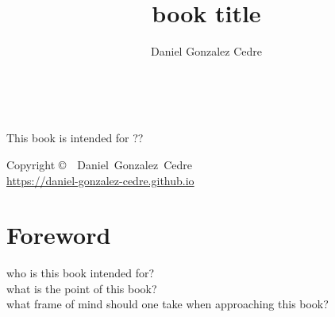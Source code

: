 





\title{book title}
\author[Daniel Gonzalez Cedre]{Daniel Gonzalez Cedre}

\makeindex[intoc]



\frontmatter

\maketitle

\newpage  %
\begin{fullwidth}
    ~\vfill
    \thispagestyle{empty}
    \setlength{\parindent}{0pt}
    \setlength{\parskip}{\baselineskip}


    \par This book is intended for ??

    \par Copyright \copyright\ \the\year\ Daniel~Gonzalez~Cedre\\
    \url{https://daniel-gonzalez-cedre.github.io}
\end{fullwidth}

\tableofcontents

\mainmatter

\chapter*{Foreword}
who is this book intended for?\\
what is the point of this book?\\
what frame of mind should one take when approaching this book?



\appendix


\blankpage
\printindex


